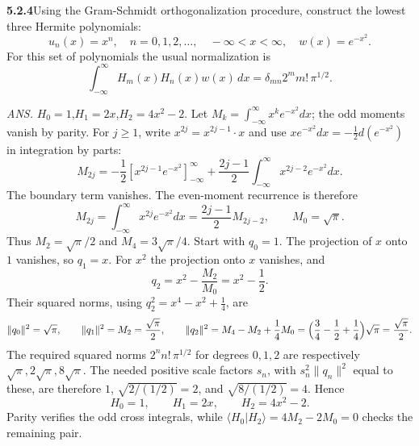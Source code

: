 \par\bigskip
\noindent\textbf{5.2.4}\quad Using the Gram-Schmidt orthogonalization
procedure, construct the lowest three Hermite polynomials:
\[
u_{n}(x)=x^{n},\quad n=0,1,2,\ldots,\quad-\infty<x<\infty,\quad
w(x)=e^{-x^{2}}.
\]
For this set of polynomials the usual normalization is
\[
\int_{-\infty}^{\infty}H_{m}(x)H_{n}(x)w(x)\,dx
=\delta_{mn}2^{m}m!\,\pi^{1/2}.
\]
\par\nobreak\hfill\emph{ANS.}\enspace
$H_{0}=1$,\quad$H_{1}=2x$,\quad$H_{2}=4x^{2}-2$.
\solution
Let $M_k=\int_{-\infty}^{\infty}x^ke^{-x^2}dx$; the odd moments vanish by
parity. For $j\ge1$, write $x^{2j}=x^{2j-1}\cdot x$ and use
$x e^{-x^2}dx=-\tfrac12d(e^{-x^2})$ in integration by parts:
\[
M_{2j}=-\frac12[x^{2j-1}e^{-x^2}]_{-\infty}^{\infty}
 +\frac{2j-1}{2}\int_{-\infty}^{\infty}x^{2j-2}e^{-x^2}dx.
\]
The boundary term vanishes. The even-moment recurrence is therefore
\[
M_{2j}=\int_{-\infty}^{\infty}x^{2j}e^{-x^2}dx
=\frac{2j-1}{2}M_{2j-2},\qquad M_0=\sqrt\pi.
\]
Thus $M_2=\sqrt\pi/2$ and $M_4=3\sqrt\pi/4$.
Start with $q_0=1$. The projection of $x$ onto $1$ vanishes, so $q_1=x$.
For $x^2$ the projection onto $x$ vanishes, and
\[
q_2=x^2-\frac{M_2}{M_0}=x^2-\frac12.
\]
Their squared norms, using $q_2^2=x^4-x^2+\frac14$, are
\[
\|q_0\|^2=\sqrt\pi,\qquad
\|q_1\|^2=M_2=\frac{\sqrt\pi}{2},\qquad
\|q_2\|^2=M_4-M_2+\frac14M_0
=\Bigl(\frac34-\frac12+\frac14\Bigr)\sqrt\pi=\frac{\sqrt\pi}{2}.
\]
The required squared norms $2^nn!\,\pi^{1/2}$ for degrees $0,1,2$ are
respectively $\sqrt\pi,2\sqrt\pi,8\sqrt\pi$.
The needed positive scale factors $s_n$, with $s_n^2\|q_n\|^2$ equal to
these, are therefore
$1$, $\sqrt{2/(1/2)}=2$, and $\sqrt{8/(1/2)}=4$. Hence
\[
\boxed{H_0=1,\qquad H_1=2x,\qquad H_2=4x^2-2}.
\]
Parity verifies the odd cross integrals, while
$\langle H_0|H_2\rangle=4M_2-2M_0=0$ checks the remaining pair.

